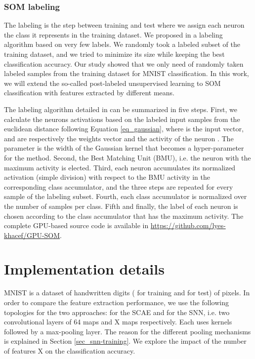 \documentclass[runningheads]{llncs}
\begin{document}
\subsubsection{SOM labeling}
\label{sec_som-labeling}
The labeling is the step between training and test where we assign each neuron the class it represents in the training dataset. We proposed in \cite{khacef2019self-organizing_neurons} a labeling algorithm based on very few labels. We randomly took a labeled subset of the training dataset, and we tried to minimize its size while keeping the best classification accuracy. Our study showed that we only need  of randomly taken labeled samples from the training dataset for MNIST classification. In this work, we will extend the so-called post-labeled unsupervised learning to SOM classification with features extracted by different means.

The labeling algorithm detailed in \cite{khacef2019self-organizing_neurons} can be summarized in five steps.
First, we calculate the neurons activations based on the labeled input samples from the euclidean distance following Equation \ref{eq_gaussian}, where  is the input vector,  and  are respectively the weights vector and the activity of the neuron . The parameter  is the width of the Gaussian kernel that becomes a hyper-parameter for the method.
Second, the Best Matching Unit (BMU), i.e. the neuron with the maximum activity is elected.
Third, each neuron accumulates its normalized activation (simple division) with respect to the BMU activity in the corresponding class accumulator, and the three steps are repeated for every sample of the labeling subset.
Fourth, each class accumulator is normalized over the number of samples per class.
Fifth and finally, the label of each neuron is chosen according to the class accumulator that has the maximum activity.
The complete GPU-based source code is available in \url{https://github.com/lyes-khacef/GPU-SOM}.



\section{Implementation details}
\label{sec_methods}
MNIST \cite{lecun1998mnist} is a dataset of  handwritten digits ( for training and  for test) of  pixels.
In order to compare the feature extraction performance, we use the following topologies for the two approaches:   for the SCAE and  for the SNN, i.e. two convolutional layers of 64 maps and X maps respectively. Each uses  kernels followed by a max-pooling layer. The reason for the different pooling mechanisms is explained in Section \ref{sec_snn-training}. We explore the impact of the number of features X on the classification accuracy. 
\end{document}
